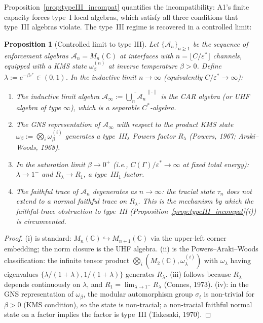 \documentclass[11pt,a4paper]{article}
\newtheorem{proposition}[theorem]{Proposition}
\theoremstyle{definition}
\newcommand{\eps}{\varepsilon}
\begin{document}
\noindent Proposition~\ref{prop:typeIII_incompat} quantifies the
incompatibility: A1's finite capacity forces type~I local algebras,
which satisfy all three conditions that type~III algebras violate.
The type~III regime is recovered in a controlled limit:

\begin{proposition}[Controlled limit to type III]\label{prop:typeIII_limit}
Let $\{\mathcal{A}_n\}_{n \ge 1}$ be the sequence of enforcement
algebras $\mathcal{A}_n = M_n(\mathbb{C})$ at interfaces with
$n = \lfloor C / \eps^* \rfloor$ channels, equipped with a KMS state
$\omega_\beta^{(n)}$ at inverse temperature $\beta > 0$.  Define
$\lambda := e^{-\beta\eps^*} \in (0,1)$.  In the inductive limit
$n \to \infty$ (equivalently $C / \eps^* \to \infty$):
\begin{enumerate}[label=(\roman*),nosep]
  \item The inductive limit algebra
  $\mathcal{A}_\infty := \overline{\bigcup_n \mathcal{A}_n}^{\|\cdot\|}$
  is the CAR algebra (or UHF algebra of type $\infty$), which is a
  separable $C^*$-algebra.
  \item The GNS representation of $\mathcal{A}_\infty$ with respect to
  the product KMS state $\omega_\beta := \bigotimes_i \omega_\beta^{(i)}$
  generates a type~III$_\lambda$ Powers factor $R_\lambda$
  (Powers, 1967; Araki--Woods, 1968).
  \item In the saturation limit $\beta \to 0^+$ (i.e.,
  $C(\Gamma) / \eps^* \to \infty$ at fixed total energy):
  $\lambda \to 1^-$ and $R_\lambda \to R_1$, a type~III$_1$ factor.
  \item The faithful trace of $\mathcal{A}_n$ degenerates as
  $n \to \infty$: the tracial state $\tau_n$ does not extend to a
  normal faithful trace on $R_\lambda$.  This is the mechanism by
  which the faithful-trace obstruction to type~III
  (Proposition~\ref{prop:typeIII_incompat}(i)) is circumvented.
\end{enumerate}
\end{proposition}

\begin{proof}
(i) is standard: $M_n(\mathbb{C}) \hookrightarrow M_{n+1}(\mathbb{C})$
via the upper-left corner embedding; the norm closure is the UHF algebra.
(ii) is the Powers--Araki--Woods classification: the infinite tensor
product $\bigotimes_i (M_2(\mathbb{C}), \omega_\lambda^{(i)})$ with
$\omega_\lambda$ having eigenvalues $\{\lambda/(1+\lambda),
1/(1+\lambda)\}$ generates $R_\lambda$.  (iii) follows because
$R_\lambda$ depends continuously on $\lambda$, and
$R_1 = \lim_{\lambda \to 1^-} R_\lambda$ (Connes, 1973).  (iv): in
the GNS representation of $\omega_\beta$, the modular automorphism
group $\sigma_t$ is non-trivial for $\beta > 0$ (KMS condition), so
the state is non-tracial; a non-tracial faithful normal state on a
factor implies the factor is type~III (Takesaki, 1970).
\end{proof}
\end{document}

